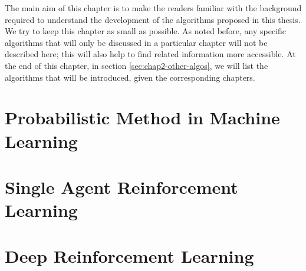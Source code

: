 \label{chapter:chap2}
\begin{adjustwidth}{1cm}{}
    The main aim of this chapter is to make the readers familiar with the background required to understand the development of the algorithms proposed in this thesis. We try to keep this chapter as small as possible. As noted before, any specific algorithms that will only be discussed in a particular chapter will not be described here; this will also help to find related information more accessible. At the end of this chapter, in section \ref{sec:chap2-other-algos}, we will list the algorithms that will be introduced, given the corresponding chapters.
\end{adjustwidth}


\section{Probabilistic Method in Machine Learning}


\section{Single Agent Reinforcement Learning}


\section{Deep Reinforcement Learning}


